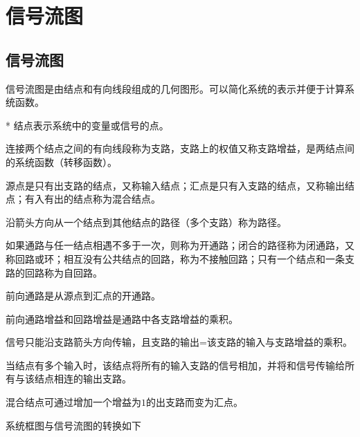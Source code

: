 \section{信号流图}

\subsection{信号流图}

\begin{BoxDefinition}[信号流图]
    信号流图是由结点和有向线段组成的几何图形。可以简化系统的表示并便于计算系统函数。
\end{BoxDefinition}

\begin{BoxDefinition}[信号流图的常用术语]*
    结点表示系统中的变量或信号的点。

    连接两个结点之间的有向线段称为支路，支路上的权值又称支路增益，是两结点间的系统函数（转移函数）。

    源点是只有出支路的结点，又称输入结点；汇点是只有入支路的结点，又称输出结点；有入有出的结点称为混合结点。

    沿箭头方向从一个结点到其他结点的路径（多个支路）称为路径。

    如果通路与任一结点相遇不多于一次，则称为开通路；闭合的路径称为闭通路，又称回路或环；相互没有公共结点的回路，称为不接触回路；只有一个结点和一条支路的回路称为自回路。

    前向通路是从源点到汇点的开通路。

    前向通路增益和回路增益是通路中各支路增益的乘积。
\end{BoxDefinition}

\begin{BoxProperty}[信号流图的基本性质]
    信号只能沿支路箭头方向传输，且支路的输出=该支路的输入与支路增益的乘积。

    当结点有多个输入时，该结点将所有的输入支路的信号相加，并将和信号传输给所有与该结点相连的输出支路。

    混合结点可通过增加一个增益为$1$的出支路而变为汇点。
\end{BoxProperty}

系统框图与信号流图的转换如下

